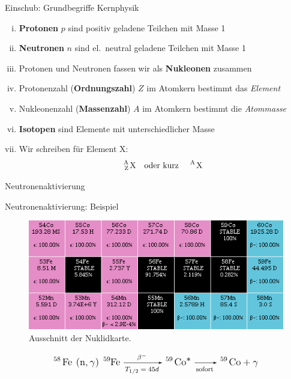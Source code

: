 \documentclass[xcolor=dvipsnames, aspectratio=169]{beamer}
\begin{document}
\begin{frame}[<+->]{Einschub: Grundbegriffe Kernphysik}
\begin{enumerate}[(i)]
\item \textbf{Protonen} $p$ sind positiv geladene Teilchen mit Masse 1
\item \textbf{Neutronen} $n$ sind el.\ neutral geladene Teilchen mit Masse 1
\item Protonen und Neutronen fassen wir als \textbf{Nukleonen} zusammen
\item Protonenzahl (\textbf{Ordnungszahl}) $Z$ im Atomkern bestimmt das \emph{Element}
\item Nukleonenzahl (\textbf{Massenzahl}) $A$ im Atomkern bestimmt die \emph{Atommasse}
\item \textbf{Isotopen} sind Elemente mit unterschiedlicher Masse
\item Wir schreiben für Element X: \[\text{\ce{^A_Z X}\quad oder kurz \quad\ce{^A X}}\]
\end{enumerate}
\end{frame}

\begin{frame}{Neutronenaktivierung}
\begin{center}\vspace*{-2.5em}
\end{center}
\end{frame}

\begin{frame}{Neutronenaktivierung: Beispiel}
\begin{figure}
\includegraphics[height=.45\textheight]{img/nuclidchart.png}
\caption{Ausschnitt der Nuklidkarte.}
\end{figure}
\[\large\text{\ce{^{58} Fe \:(n,$\gamma$)\: ^{59}Fe ->[$\beta^-$][$T_{1/2}=45d$] ^{59} Co^* ->[][sofort] ^{59} Co + $\gamma$}}\]
\end{frame}
\end{document}
